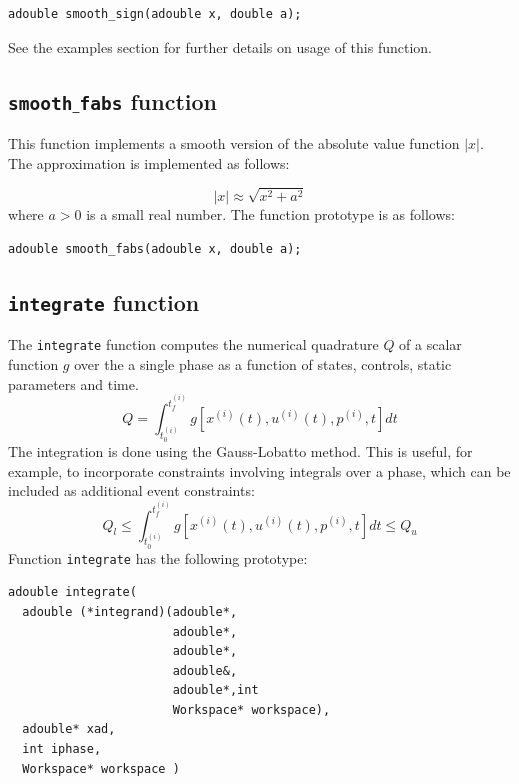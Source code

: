 \documentclass[a4paper,11pt]{report}    %
\begin{document}
\begin{verbatim}
adouble smooth_sign(adouble x, double a);
\end{verbatim}
See the examples section for further details on usage of this function.



\subsection{ \texttt{smooth$\_$fabs} function}

This function implements a smooth version of the absolute value function
$|x|$. The approximation is implemented as follows:

\begin{equation}
|x| \approx \sqrt{ x^2 + a^2 }
\end{equation}
where $a>0$ is a small real number.
The function prototype is as follows:

\begin{verbatim}
adouble smooth_fabs(adouble x, double a);
\end{verbatim}


\subsection{ \texttt{integrate} function}

The \texttt{integrate} function computes the numerical quadrature $Q$ of a scalar function $g$
over the a single phase as a function of states, controls, static parameters
and time. 
\begin{equation}
  Q = \int_{t_0^{(i)}}^{t_f^{(i)}} g[ x^{(i)}(t), u^{(i)}(t), p^{(i)}, t ]  dt
\end{equation}
The integration is done using the Gauss-Lobatto method. This is useful, for example, to incorporate constraints involving
integrals over a phase, which can be included as additional event constraints:
\begin{equation}
  Q_l \le  \int_{t_0^{(i)}}^{t_f^{(i)}} g[ x^{(i)}(t), u^{(i)}(t), p^{(i)}, t ]  dt \le Q_u
\end{equation}
Function \texttt{integrate} has the following prototype:

\begin{verbatim}
adouble integrate( 
  adouble (*integrand)(adouble*,
                       adouble*,
                       adouble*,
                       adouble&,
                       adouble*,int
                       Workspace* workspace), 
  adouble* xad, 
  int iphase,
  Workspace* workspace )
\end{verbatim}
\end{document}

